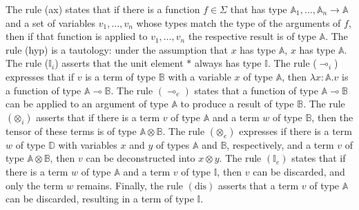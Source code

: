 The rule (ax) states that if there is a function $f \in \Sigma$ that has type $\mathbb{A}_1, \ldots, \mathbb{A}_n \rightarrow \mathbb{A}$ and a set of variables $v_1,\ldots, v_n$ whose types match the type of the arguments of $f$, then if that function is applied to $v_1,…,v_n$ the respective result is of type $\mathbb{A}$.
The rule (hyp) is a tautology: under the assumption that $x$ has type $\mathbb{A}$, $x$ has type $\mathbb{A}$. 
The rule ($\mathbb{I}_{i}$) asserts that the unit element $*$ always has type $\mathbb{I}$. 
The rule ($\multimap_i$) expresses that if $v$ is a term of type $\mathbb{B}$ with a variable $x$ of type $\mathbb{A}$, then $\lambda x:\mathbb{A} . v$ is a function of type $\mathbb{A} \multimap \mathbb{B} $. 
The rule $(\multimap_e)$ states that a function of type $\mathbb{A} \multimap \mathbb{B}$  can be applied to an argument of type $\mathbb{A}$  to produce a result of type $\mathbb{B}$. 
The rule $(\mathbb{\otimes}_i)$  asserts that if there is a term $v$ of type $\mathbb{A}$ and a term $w$ of type $\mathbb{B}$,  then the tensor of these terms is of type $\mathbb{A} \otimes \mathbb{B}$.
The rule $(\mathbb{\otimes}_e)$ expresses if there is a term $w$ of type $\mathbb{D}$ with variables $x$ and $y$ of types $\mathbb{A}$ and $\mathbb{B}$, respectively, and a term $v$ of type $\mathbb{A} \otimes \mathbb{B}$, then $v$ can be deconstructed into $x \otimes y$. 
The rule $(\mathbb{I}_e)$ states that if there is a term $w$ of type $\mathbb{A}$ and a term $v$ of type $\mathbb{I}$, then $v$ can be discarded, and only the term $w$ remains. 
Finally, the rule $(\text{dis})$ asserts that a term $v$ of type $\mathbb{A}$ can be discarded, resulting in a term of type $\mathbb{I}$.

